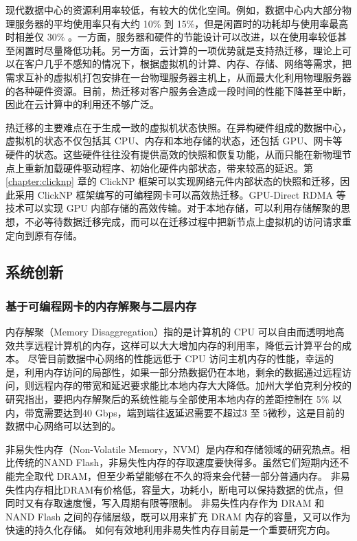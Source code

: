 现代数据中心的资源利用率较低，有较大的优化空间。例如，数据中心内大部分物理服务器的平均使用率只有大约 10\% 到 15\%，但是闲置时的功耗却与使用率最高时相差仅 30\% \cite{barroso2018datacenter}。一方面，服务器和硬件的节能设计可以改进，以在使用率较低甚至闲置时尽量降低功耗。另一方面，云计算的一项优势就是支持热迁移，理论上可以在客户几乎不感知的情况下，根据虚拟机的计算、内存、存储、网络等需求，把需求互补的虚拟机打包安排在一台物理服务器主机上，从而最大化利用物理服务器的各种硬件资源。目前，热迁移对客户服务会造成一段时间的性能下降甚至中断，因此在云计算中的利用还不够广泛。

热迁移的主要难点在于生成一致的虚拟机状态快照。在异构硬件组成的数据中心，虚拟机的状态不仅包括其 CPU、内存和本地存储的状态，还包括 GPU、网卡等硬件的状态。这些硬件往往没有提供高效的快照和恢复功能，从而只能在新物理节点上重新加载硬件驱动程序、初始化硬件内部状态，带来较高的延迟。第 \ref{chapter:clicknp} 章的 ClickNP 框架可以实现网络元件内部状态的快照和迁移，因此采用 ClickNP 框架编写的可编程网卡可以高效热迁移。GPU-Direct RDMA 等技术可以实现 GPU 内部存储的高效传输。对于本地存储，可以利用存储解聚的思想，不必等待数据迁移完成，而可以在迁移过程中把新节点上虚拟机的访问请求重定向到原有存储。


\subsection{系统创新}
\label{future:system}

\subsubsection{基于可编程网卡的内存解聚与二层内存}
\label{future:second-tier-memory}

内存解聚（Memory Disaggregation）指的是计算机的 CPU 可以自由而透明地高效共享远程计算机的内存，这样可以大大增加内存的利用率，降低云计算平台的成本。
尽管目前数据中心网络的性能远低于 CPU 访问主机内存的性能，幸运的是，利用内存访问的局部性，如果一部分热数据仍在本地，剩余的数据通过远程访问，则远程内存的带宽和延迟要求能比本地内存大大降低。加州大学伯克利分校的研究指出，要把内存解聚后的系统性能与全部使用本地内存的差距控制在 5\% 以内，带宽需要达到40 Gbps，端到端往返延迟需要不超过3 至 5微秒，这是目前的数据中心网络可以达到的。

非易失性内存（Non-Volatile Memory，NVM）是内存和存储领域的研究热点。相比传统的NAND Flash，非易失性内存的存取速度要快得多。虽然它们短期内还不能完全取代 DRAM，但至少希望能够在不久的将来会代替一部分普通内存。
非易失性内存相比DRAM有价格低，容量大，功耗小，断电可以保持数据的优点，但同时又有存取速度慢，写入周期有限等限制。
非易失性内存作为 DRAM 和 NAND Flash 之间的存储层级，既可以用来扩充 DRAM 内存的容量，又可以作为快速的持久化存储。
如何有效地利用非易失性内存目前是一个重要研究方向。

